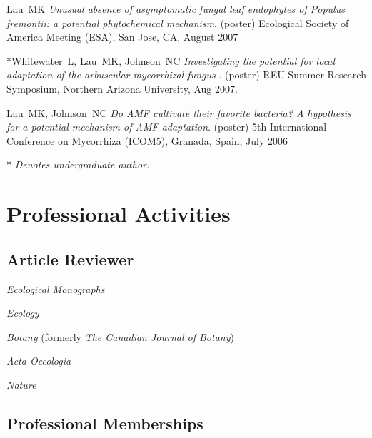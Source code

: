 \documentclass[letterpaper]{article}
\renewenvironment{itemize}{
  \begin{list}{}{
    \setlength{\leftmargin}{1em}
  }
}{
  \end{list}
}
\begin{document}
\begin{itemize}
\item Lau\ MK \textit{Unusual absence of asymptomatic fungal leaf endophytes of 
Populus fremontii: a potential phytochemical mechanism}. (poster) Ecological Society of America Meeting (ESA), San Jose, CA, August 2007

\item \mbox{*}Whitewater\ L, Lau\ MK, Johnson\ NC \textit{Investigating the
  potential for local adaptation of the arbuscular mycorrhizal fungus}
  . (poster) REU Summer Research
  Symposium, Northern Arizona University, Aug 2007.

\item Lau\ MK, Johnson\ NC \textit{Do AMF cultivate their favorite bacteria? A hypothesis for a 
potential mechanism of AMF adaptation}. (poster) 5th International Conference on Mycorrhiza (ICOM5), Granada, Spain, July 2006

\mbox{*} \textit{Denotes undergraduate author.}

\end{itemize}


\section{Professional Activities}

\subsection{Article Reviewer}
\begin{itemize}
\item \textit{Ecological Monographs} 
\item \textit{Ecology} 
\item \textit{Botany} (formerly \textit{The Canadian Journal of Botany}) 
\item \textit{Acta Oecologia} 
\item \textit{Nature} 
\end{itemize}

\subsection{Professional Memberships}
\end{document}

